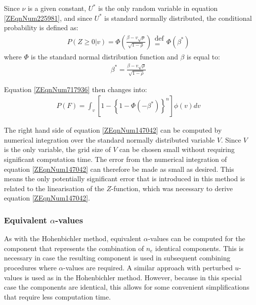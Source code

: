 {Since $\nu$ is a given constant, $U^{*}$ is the only random variable in equation \eqref{ZEqnNum225981}, and since $U^{*}$ is standard normally distributed, the conditional probability is defined as:
\begin{align}
P\left(Z\ge 0|v\right)=\Phi \left(\frac{\beta -v\sqrt{\rho } }{\sqrt{1-\rho } } \right)\begin{array}{c} {\text{def}} \\ {=} \\ {} \end{array}\Phi \left(\beta ^{*} \right)\label{0.143)} 
\end{align}
where $\Phi$ is the standard normal distribution function and $\beta$ is equal to:
\begin{align}
\beta ^{*} =\frac{\beta -v\sqrt{\rho } }{\sqrt{1-\rho } } \label{0.144)} 
\end{align}

Equation \eqref{ZEqnNum717936} then changes into: 
\begin{align}
P(F)=\int _{v}^{}\left[1-\left\{1-\Phi \left(-\beta^{*}\right)\right\}^{n} \right]\phi (v)dv \label{ZEqnNum147042} 
\end{align}

The right hand side of equation \eqref{ZEqnNum147042} can be computed by numerical integration over the standard normally distributed variable $V$.
Since $V$ is the only variable, the grid size of $V$ can be chosen small without requiring significant computation time.
The error from the numerical integration of equation \eqref{ZEqnNum147042} can therefore be made as small as desired.
This means the only potentially significant error that is introduced in this method is related to the linearisation of the $Z$-function, which was necessary to derive equation \eqref{ZEqnNum147042}.

\subsubsection{Equivalent $\alpha$-values}\label{Section_2.4.3.3}

As with the Hohenbichler method, equivalent $\alpha$-values can be computed for the component that represents the combination of $n_{e}$ identical components.
This is necessary in case the resulting component is used in subsequent combining procedures where $\alpha$-values are required.
A similar approach with perturbed $u$-values is used as in the Hohenbichler method.
However, because in this special case the components are identical, this allows for some convenient simplifications that require less computation time.

}
